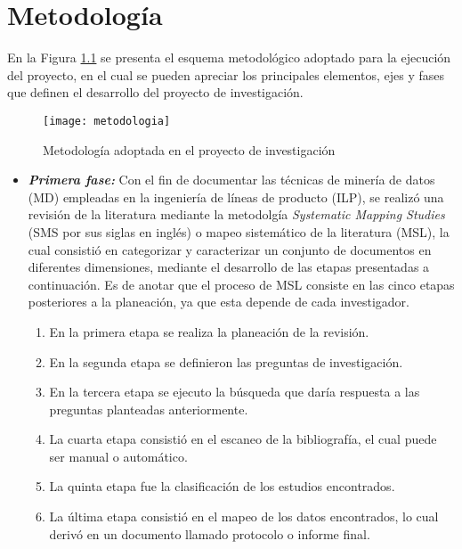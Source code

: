 \chapter{Metodología}



En la Figura \ref{metodologia} se presenta el esquema metodológico adoptado para la ejecución del proyecto, en el cual se pueden apreciar los principales elementos, ejes y fases que definen el desarrollo del proyecto de investigación.
\begin{figure}[ht]
\centering
\texttt{[image: metodologia]}
\caption{Metodología adoptada en el proyecto de investigación}
\label{metodologia}
\end{figure}


\begin{itemize}

\item \textbf{\textit{Primera fase:}} Con el fin de documentar las técnicas de minería de datos (MD) empleadas en la ingeniería de líneas de producto (ILP), se realizó una revisión de la literatura mediante la metodolgía \textit{Systematic Mapping Studies} (SMS por sus siglas en inglés) o mapeo sistemático de la literatura (MSL),  la cual consistió en categorizar y caracterizar un conjunto de documentos en diferentes dimensiones, mediante el  desarrollo de las etapas presentadas a continuación. Es de anotar que el proceso de MSL consiste en las cinco etapas posteriores a la planeación, ya que esta depende de cada investigador. 

\begin{enumerate}
\item En la primera etapa se realiza la planeación de la revisión.
\item En la segunda etapa se definieron las preguntas de investigación.
\item En la tercera etapa se ejecuto la búsqueda que daría respuesta a las preguntas planteadas anteriormente.
\item La cuarta etapa consistió en el escaneo de la bibliografía, el cual puede ser manual o automático.
\item La quinta etapa fue la clasificación de los estudios encontrados. 
\item La última etapa consistió en el mapeo de los datos encontrados, lo cual derivó en un documento llamado protocolo o informe final.
\end{enumerate}


\end{itemize}
